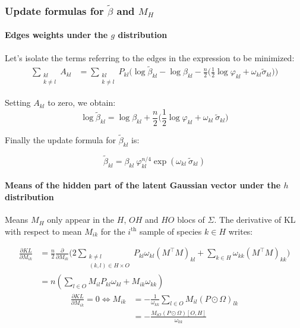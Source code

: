 \documentclass[11pt,a4paper]{article}
\begin{document}
\subsubsection{Update formulas for $\widetilde{\beta}$ and $M_H$ }

\paragraph{Edges weights under the $g$ distribution \\}
Let's isolate the terms referring to the edges in the expression to be minimized:
\begin{align*}
 \sum_{\substack{kl\\ k \neq l}} A_{kl} &= \sum_{\substack{kl\\ k \neq l}} P_{kl}\Big(\log \widetilde{\beta}_{kl} - \log \beta_{kl} - \frac{n}{2} \big( \frac{1}{2} \log \varphi_{kl} +\omega_{kl} \widetilde{\sigma}_{kl} \big)\Big)   
\end{align*}

 
Setting $A_{kl}$ to zero, we obtain:
 $$\log \widetilde{\beta}_{kl} = \log \beta_{kl} + \frac{n}{2} \big( \frac{1}{2} \log \varphi_{kl} + \omega_{kl}\: \widetilde{\sigma}_{kl} \big) $$
 
 Finally the update formula for $\widetilde{\beta}_{kl}$ is:
 
  $$\boxed{\displaystyle \widetilde{\beta}_{kl} = \beta_{kl} \: \varphi_{kl}^{n/4} \exp( \omega_{kl}\: \widetilde{\sigma}_{kl} ) }$$
 
\paragraph{Means of the hidden part of the latent Gaussian vector under the $h$ distribution \\}
Means $M_H$ only appear in the $H$, $OH$ and $HO$ blocs of $\Sigma$. The derivative of KL with respect to mean $M_{ik}$ for the $i^\text{th}$ sample of species $k\in H$ writes:

\begin{align*}
\frac{\partial KL}{\partial M_{ik}} &=\frac{n}{2}\frac{\partial}{\partial M_{ik}}\Big(2\sum_{\substack{k \neq l\\
(k, l) \in H\times O}} P_{kl} \omega_{kl} (M^\intercal M)_{kl} + \sum_{k\in H} \omega_{kk} (M^\intercal M)_{kk}\Big)\\
&= n( \sum_{l \in O } M_{il} P_{kl}\omega_{kl} + M_{ik} \omega_{kk}) 
\end{align*}
\begin{align*}
\frac{\partial KL}{\partial M_{ik}}  = 0\iff M_{ik} &= -\frac{1}{\omega_{kk}} \sum_{l\in O} M_{il} (P\odot\Omega)_{lk}\\
&=-\frac{M_{iO} (P\odot\Omega)[O,H]}{\omega_{kk}}
\end{align*}
\end{document}
